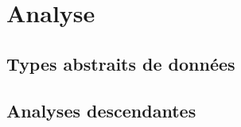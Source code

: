 \chapter{Analyse}

\section{Types abstraits de données}















\section{Analyses descendantes}



